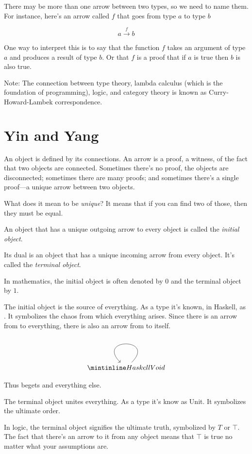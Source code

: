 \documentclass[DaoFP]{subfiles}
\begin{document}
There may be more than one arrow between two types, so we need to name them. For instance, here's an arrow called $f$ that goes from type $a$ to type $b$

\[ a \xrightarrow f b \]

One way to interpret this is to say that the function $ f$ takes an argument of type $a$ and produces a result of type $b$. Or that $ f$ is a proof that if $a$ is true then $b$ is also true.

Note: The connection between type theory, lambda calculus (which is the foundation of programming), logic, and category theory is known as Curry-Howard-Lambek correspondence.

\section{Yin and Yang}

An object is defined by its connections. An arrow is a proof, a witness, of the fact that two objects are connected. Sometimes there's no proof, the objects are disconnected; sometimes there are many proofs; and sometimes there's a single proof---a unique arrow between two objects.

What does it mean to be \emph{unique}? It means that if you can find two of those, then they must be equal.

An object that has a unique outgoing arrow to every object is called the \emph{initial object}.

Its dual is an object that has a unique incoming arrow from every object. It's called the \emph{terminal object}. 

In mathematics, the initial object is often denoted by $0$ and the terminal object by $1$.

The initial object is the source of everything. As a type it's known, in Haskell, as . It symbolizes the chaos from which everything arises. Since there is an arrow from  to everything, there is also an arrow from  to itself. 

\[
 \begin{tikzcd}
 \hask{Void}
 \arrow[loop]
 \end{tikzcd}
\]

Thus  begets  and everything else.

The terminal object unites everything. As a type it's know as Unit. It symbolizes the ultimate order.

In logic, the terminal object signifies the ultimate truth, symbolized by $T$ or $ \top$. The fact that there's an arrow to it from any object means that $ \top$ is true no matter what your assumptions are. 
\end{document}
